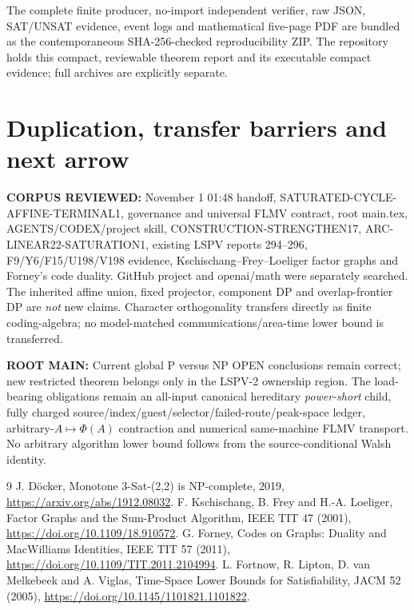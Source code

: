 \documentclass[11pt]{article}
\begin{document}
The complete finite producer, no-import independent verifier, raw JSON, SAT/UNSAT evidence, event logs and mathematical five-page PDF are bundled as the contemporaneous SHA-256-checked reproducibility ZIP. The repository holds this compact, reviewable theorem report and its executable compact evidence; full archives are explicitly separate.

\section{Duplication, transfer barriers and next arrow}
\textbf{CORPUS REVIEWED:} November 1 01:48 handoff, SATURATED-CYCLE-AFFINE-TERMINAL1, governance and universal FLMV contract, root main.tex, AGENTS/CODEX/project skill, CONSTRUCTION-STRENGTHEN17, ARC-LINEAR22-SATURATION1, existing LSPV reports 294--296, F9/Y6/F15/U198/V198 evidence, Kschischang--Frey--Loeliger factor graphs and Forney's code duality. GitHub project and openai/math were separately searched. The inherited affine union, fixed projector, component DP and overlap-frontier DP are \emph{not} new claims. Character orthogonality transfers directly as finite coding-algebra; no model-matched communications/area-time lower bound is transferred.

\textbf{ROOT MAIN:} Current global P versus NP OPEN conclusions remain correct; new restricted theorem belongs only in the LSPV-2 ownership region. The load-bearing obligations remain an all-input canonical hereditary \emph{power-short} child, fully charged source/index/guest/selector/failed-route/peak-space ledger, arbitrary-$A\mapsto\Phi(A)$ contraction and numerical same-machine FLMV transport. No arbitrary algorithm lower bound follows from the source-conditional Walsh identity.

\begin{thebibliography}{9}
 J. D\"ocker, Monotone 3-Sat-(2,2) is NP-complete, 2019, \url{https://arxiv.org/abs/1912.08032}.
 F. Kschischang, B. Frey and H.-A. Loeliger, Factor Graphs and the Sum-Product Algorithm, IEEE TIT 47 (2001), \url{https://doi.org/10.1109/18.910572}.
 G. Forney, Codes on Graphs: Duality and MacWilliams Identities, IEEE TIT 57 (2011), \url{https://doi.org/10.1109/TIT.2011.2104994}.
 L. Fortnow, R. Lipton, D. van Melkebeek and A. Viglas, Time-Space Lower Bounds for Satisfiability, JACM 52 (2005), \url{https://doi.org/10.1145/1101821.1101822}.
\end{thebibliography}
\end{document}
